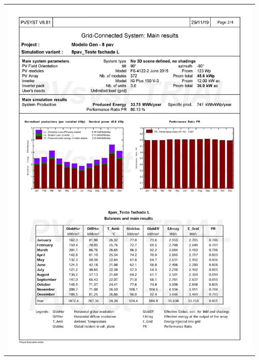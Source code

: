 \begin{table}[H]
    \centering
    \begin{tabular}{l}
        \includegraphics[width=\textwidth]{figures/attachments/resultpv4.jpg}
    \end{tabular}
\end{table}
\pagebreak
